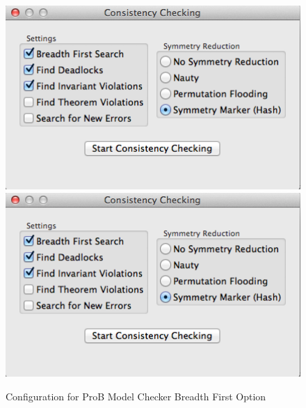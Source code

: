  \begin{figure}[!htbp]
  \centering
  \ifplastex
  \includegraphics[width=1024]{figures/image35.png}
  \else
  \includegraphics[width=1\textwidth]{figures/image35.png}
  \fi
  \caption{Configuration for ProB Model Checker Breadth First Option}
  \label{fig:ConfigurationForProBModelCheckerBreadthFirstOption}
\end{figure} 
 
